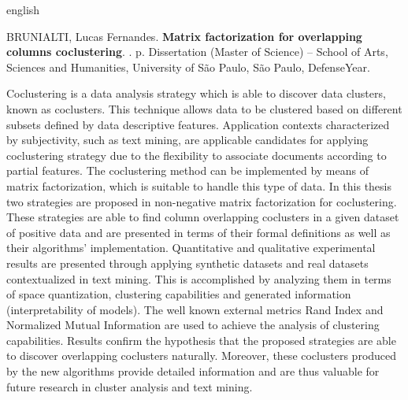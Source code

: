 \documentclass[
    12pt,                %
    oneside,            %
    a4paper,            %
    english,            %
    brazil                %
    ]{abntex2ppgsi}
\begin{document}
%
%
\begin{resumo}[Abstract]
\begin{otherlanguage*}{english}

%
%
%
%
\begin{flushleft}
BRUNIALTI, Lucas Fernandes. \textbf{Matrix factorization for overlapping columns coclustering}. \imprimirdata. \pageref{LastPage} p. Dissertation (Master of Science) – School of Arts, Sciences and Humanities, University of São Paulo, São Paulo, DefenseYear.
\end{flushleft}

Coclustering is a data analysis strategy which is able to discover data clusters, known as coclusters.
This technique allows data to be clustered based on different subsets defined by data descriptive features.
Application contexts characterized by subjectivity, such as text mining, are applicable candidates for applying coclustering strategy due to the flexibility to associate documents according to partial features.
The coclustering method can be implemented by means of matrix factorization, which is suitable to handle this type of data.
In this thesis two strategies are proposed in non-negative matrix factorization for coclustering.
These strategies are able to find column overlapping coclusters in a given dataset of positive data and are presented in terms of their formal definitions as well as their algorithms' implementation.
Quantitative and qualitative experimental results are presented through applying synthetic datasets and real datasets contextualized in text mining.
This is accomplished by analyzing them in terms of space quantization, clustering capabilities and generated information (interpretability of models).
The well known external metrics Rand Index and Normalized Mutual Information are used to achieve the analysis of clustering capabilities.
Results confirm the hypothesis that the proposed strategies are able to discover overlapping coclusters naturally.
Moreover, these coclusters produced by the new algorithms provide detailed information and are thus valuable for future research in cluster analysis and text mining.


\end{otherlanguage*}
\end{resumo}
\end{document}
